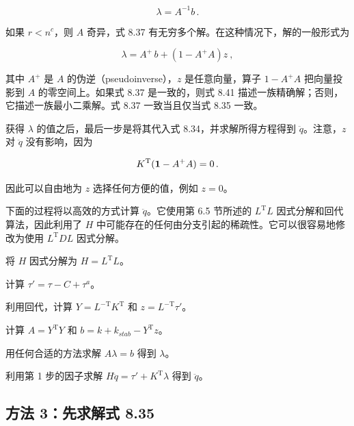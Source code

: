 \documentclass[10pt,a4paper]{book}
\theoremstyle{thmstyle} %
\theoremstyle{defstyle} %
\theoremstyle{prostyle} %
\begin{document}
$$
\lambda = A ^{- 1} b \, .
$$



如果 $r < n^{c}$，则 $A$ 奇异，式 8.37 有无穷多个解。在这种情况下，解的一般形式为



$$
\lambda = A ^{+} \, b + ( 1 - A ^{+} A ) z \ ,
$$



其中 $A^{+}$ 是 $A$ 的伪逆（pseudoinverse），$z$ 是任意向量，算子 $1-A^{+}A$ 把向量投影到 $A$ 的零空间上。如果式 8.37 是一致的，则式 8.41 描述一族精确解；否则，它描述一族最小二乘解。式 8.37 一致当且仅当式 8.35 一致。



获得 $\lambda$ 的值之后，最后一步是将其代入式 8.34，并求解所得方程得到 $\ddot{q}$。注意，$z$ 对 $\ddot{q}$ 没有影响，因为



$$
K ^{\mathrm { T} } ( { \bf 1 } - A ^{+} A ) = 0 \, .
$$



因此可以自由地为 $z$ 选择任何方便的值，例如 $z=0$。



下面的过程将以高效的方式计算 $\ddot{q}$。它使用第 6.5 节所述的 $L^{\mathrm{T}}L$ 因式分解和回代算法，因此利用了 $H$ 中可能存在的任何由分支引起的稀疏性。它可以很容易地修改为使用 $L^{\mathrm{T}}DL$ 因式分解。



将 $H$ 因式分解为 $H = L^{\text{T}}L$。



计算 $\tau' = \tau - C + \tau^{a}$。



利用回代，计算 $Y = L^{-\text{T}}K^{\text{T}}$ 和 $z = L^{-\text{T}}\tau'$。



计算 $A = Y^{\text{T}}Y$ 和 $b = k + k_{stab} - Y^{\text{T}}z$。



用任何合适的方法求解 $A\lambda = b$ 得到 $\lambda$。



利用第 1 步的因子求解 $H\ddot{q} = \tau' + K^{\text{T}}\lambda$ 得到 $\ddot{q}$。



\subsection{方法 3：先求解式 8.35}
\end{document}
